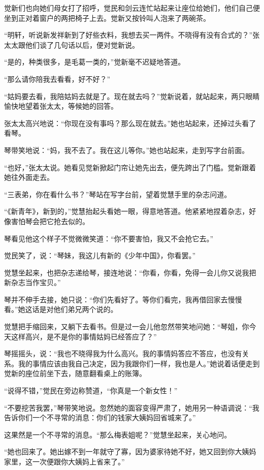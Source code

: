 \par 觉新们也向她们母女打了招呼，觉民和剑云连忙站起来让座位给她们，他们自己便坐到正对着窗户的两把椅子上去。觉新又按铃叫人泡来了两碗茶。
\par “明轩，听说新发祥新到了好些衣料，我想去买一两件。不晓得有没有合式的？”张太太跟他们谈了几句话以后，便对觉新说。
\par “是的，种类很多，是毛葛一类的，”觉新毫不迟疑地答道。
\par “那么请你陪我去看看，好不好？”
\par “姑妈要去看，我陪姑妈去就是了。现在就去吗？”觉新说着，就站起来，两只眼睛愉快地望着张太太，等候她的回答。
\par 张太太高兴地说：“你现在没有事吗？那么现在就去。”她也站起来，还掉过头看了看琴。
\par 琴带笑地说：“妈，我不去了。我在这儿等你。”她也站起来，走到写字台前面。
\par “也好，”张太太说。她看见觉新掀起门帘让她先出去，便先跨出了门槛。觉新跟着她往外面走去。
\par “三表弟，你在看什么书？”琴站在写字台前，望着觉慧手里的杂志问道。
\par “《新青年》，新到的，”觉慧抬起头看她一眼，得意地答道。他紧紧地捏着杂志，好像害怕琴会把它抢去似的。
\par 琴看见他这个样子不觉微微笑道：“你不要害怕，我又不会抢它去。”
\par 觉民笑了，说：“琴妹，我这儿有新的《少年中国》，你看罢。”
\par 觉慧坐起来，也把杂志递给琴，接连地说：“你看，你看，免得一会儿你又说我把新杂志当作宝贝。”
\par 琴并不伸手去接，她只说：“你们先看好了。等你们看完，我再借回家去慢慢看。”她这话是对他们弟兄两个说的。
\par 觉慧把手缩回来，又躺下去看书。但是过一会儿他忽然带笑地问她：“琴姐，你今天这样高兴，是不是你的事情姑妈已经答应了？”
\par 琴摇摇头，说：“我也不晓得我为什么高兴。我的事情妈答应不答应，也没有关系。我的事情应该由我自己决定，因为我跟你们一样，我也是人。”她说着话便走到觉新的座位前坐下去，随意翻看桌上的账簿。
\par “说得不错，”觉民在旁边称赞道，“你真是一个新女性！”
\par “不要挖苦我罢，”琴带笑地说。忽然她的面容变得严肃了，她用另一种语调说：“我告诉你们一个不寻常的消息：你们的钱家大姨妈回省城来了。”
\par 这果然是一个不寻常的消息。“那么梅表姐呢？”觉慧坐起来，关心地问。
\par “她也回来了。她出嫁不到一年就守了寡，因为婆家待她不好，她又回到你大姨妈家里，这一次便跟你大姨妈上省来了。”
